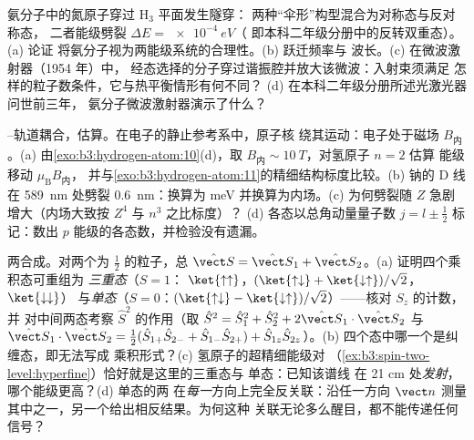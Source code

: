 \begin{exercise}[$\star\star$]\label{exo:b3:spin-two-level:9}
氨分子中的氮原子穿过 H$_3$ 平面发生隧穿：
两种“伞形”构型混合为对称态与反对称态，
二者能级劈裂 $\Delta E = \qty{e-4}{eV}$（
即本科二年级分册中的反转双重态）。(a) 论证
将氨分子视为两能级系统的合理性。(b) 跃迁频率与
波长。(c) 在微波激射器（1954 年）中，
经态选择的分子穿过谐振腔并放大该微波：入射束须满足
怎样的粒子数条件，它与热平衡情形有何不同？
(d) 在本科二年级分册所述光激光器问世前三年，
氨分子微波激射器演示了什么？
\end{exercise}

\begin{exercise}[$\star\star\star$]\label{exo:b3:spin-two-level:10}
–轨道耦合，估算。在电子的静止参考系中，原子核
绕其运动：电子处于磁场 $B_{\text
{内}}$。(a) 由\cref{exo:b3:hydrogen-atom:10}(d)，取
$B_{\text{内}} \sim \qty{10}{T}$，对氢原子 $n = 2$ 估算
能级移动 $\mu_{\text{B}}B_{\text{内}}$，
并与\cref{exo:b3:hydrogen-atom:11}的精细结构标度比较。(b) 钠的
D 线在 \qty{589}{nm} 处劈裂 \qty{0.6}{nm}：换算为 meV
并换算为内场。(c) 为何劈裂随
$Z$ 急剧增大（内场大致按 $Z^4$ 与 $n^3$ 之比标度）？
(d) 各态以总角动量量子数 $j = l \pm \tfrac12$ 标记：数出
$p$ 能级的各态数，并检验没有遗漏。
\end{exercise}

\begin{exercise}[$\star\star\star$]\label{exo:b3:spin-two-level:11}
两合成。对两个为 $\tfrac12$ 的粒子，总
 $\hat{\vect S} = \hat{\vect S}_1 + \hat{\vect S}_2$。(a) 证明四个乘积态可重组为
\emph{三重态}（$S = 1$：
$\ket{\uparrow\uparrow}$，$(\ket{\uparrow\downarrow} +
\ket{\downarrow\uparrow})/\sqrt2$，$\ket{\downarrow\downarrow}$）
与\emph{单态}（$S = 0$：$(\ket{\uparrow\downarrow} -
\ket{\downarrow\uparrow})/\sqrt2$）——核对 $S_z$ 的计数，并
对中间两态考察 $\hat S^2$ 的作用（取 $\hat
S^2 = \hat S_1^2 + \hat S_2^2 + 2\hat{\vect S}_1\cdot\hat{\vect
S}_2$ 与 $\hat{\vect S}_1\cdot\hat{\vect S}_2 = \tfrac12(\hat
S_{1+}\hat S_{2-} + \hat S_{1-}\hat S_{2+}) + \hat S_{1z}\hat
S_{2z}$）。(b) 四个态中哪一个是纠缠态，即无法写成
乘积形式？(c) 氢原子的超精细能级对
（\cref{ex:b3:spin-two-level:hyperfine}）恰好就是这里的三重态与
单态：已知该谱线
在 21 cm 处\emph{发射}，哪个能级更高？(d) 单态的两
在\emph{每一}方向上完全反关联：沿任一方向
$\vect n$ 测量其中之一，另一个给出相反结果。为何这种
关联无论多么醒目，都不能传递任何信号？
\end{exercise}

